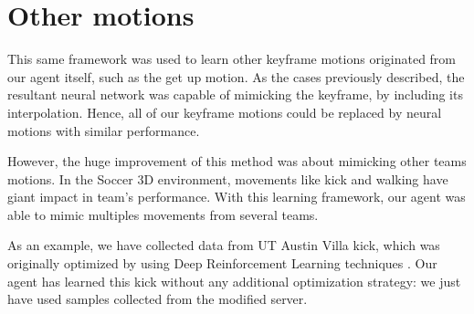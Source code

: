 \section{Other motions}

This same framework was used to learn other keyframe motions originated from our agent itself, such as the get up motion. As the cases previously described, the resultant neural network was capable of mimicking the keyframe, by including its interpolation. Hence, all of our keyframe motions could be replaced by neural motions with similar performance.

However, the huge improvement of this method was about mimicking other teams motions. In the Soccer 3D environment, movements like kick and walking have giant impact in team's performance. With this learning framework, our agent was able to mimic multiples movements from several teams.

As an example, we have collected data from UT Austin Villa kick, which was originally optimized by using Deep Reinforcement Learning techniques \cite{mcalpine2017}. Our agent has learned this kick without any additional optimization strategy: we just have used samples collected from the modified server.

